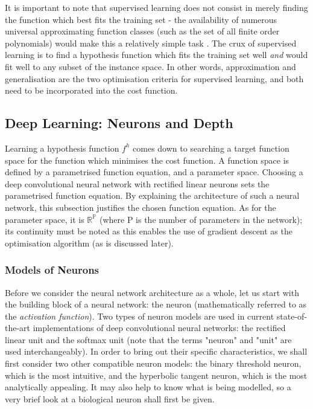\documentclass[a4paper,11pt]{article}
\begin{document}
It is important to note that supervised learning does not consist in merely finding the function which best fits the training set - the availability of numerous universal approximating function classes (such as the set of all finite order polynomials) would make this a relatively simple task \cite{univ-approx}. The crux of supervised learning is to find a hypothesis function which fits the training set well \textit{and} would fit well to any subset of the instance space. In other words, approximation and generalisation are the two optimisation criteria for supervised learning, and both need to be incorporated into the cost function.\\

\subsection{Deep Learning: Neurons and Depth}

Learning a hypothesis function $f^{h}$ comes down to searching a target function space for the function which minimises the cost function. A function space is defined by a parametrised function equation, and a parameter space. Choosing a deep convolutional neural network with rectified linear neurons sets the parametrised function equation. By explaining the architecture of such a neural network, this subsection justifies the chosen function equation. As for the parameter space, it is $\mathbb{R^{P}}$ (where P is the number of parameters in the network); its continuity must be noted as this enables the use of gradient descent as the optimisation algorithm (as is discussed later). \\


\subsubsection{Models of Neurons}

Before we consider the neural network architecture as a whole, let us start with the building block of a neural network: the neuron (mathematically referred to as the \textit{activation function}). Two types of neuron models are used in current state-of-the-art implementations of deep convolutional neural networks: the rectified linear unit and the softmax unit (note that the terms "neuron" and "unit" are used interchangeably). In order to bring out their specific characteristics, we shall first consider two other compatible neuron models: the binary threshold neuron, which is the most intuitive, and the hyperbolic tangent neuron, which is the most analytically appealing. It may also help to know what is being modelled, so a very brief look at a biological neuron shall first be given.
\end{document}
